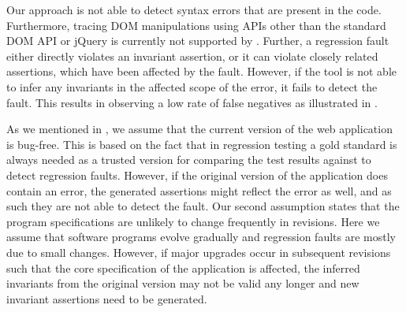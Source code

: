  Our approach is not able to detect syntax errors that are present in the \javascript code. Furthermore, tracing DOM manipulations using APIs other than the standard DOM API or jQuery is currently not supported by \jsart.
Further, a regression fault either directly violates an invariant assertion, or it can violate closely 
related assertions, which have been affected by the fault. However, if the tool is not able to infer any invariants in the  affected scope of the error, it fails to detect the fault. This results in observing a low rate of false negatives as illustrated in . 
     
 As we mentioned in , we assume that the current version of the web application is bug-free. This is   based on the fact that in  regression testing a gold standard is always needed as a trusted version for comparing the test results against \cite{Binder:2000} to detect regression faults. However, if the original version of the application does contain an error, the generated assertions might reflect the error as well, and as such they are not able to detect the fault. 
Our second assumption states that the program specifications are unlikely to change frequently in revisions. Here we assume that software programs evolve gradually and regression faults are mostly due to small changes. However, if major upgrades occur in subsequent revisions such that the core specification of the application is affected, the inferred invariants from the original version may not be valid any longer and new invariant assertions need to be generated.



 

